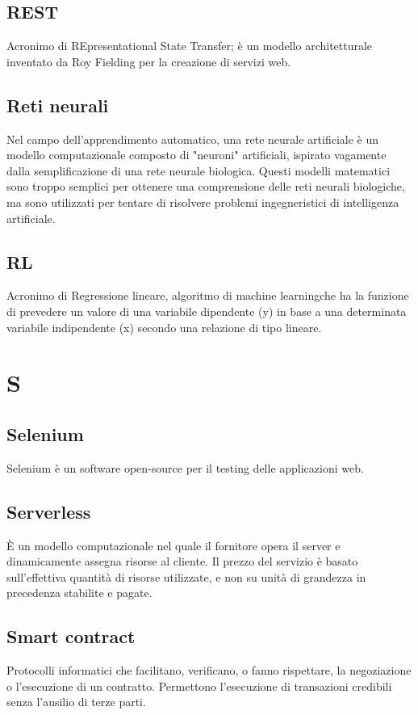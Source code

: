 \subsection*{REST}
Acronimo di REpresentational State Transfer; è un modello architetturale inventato da Roy Fielding per la creazione di servizi web.

\subsection*{Reti neurali}
Nel campo dell'apprendimento automatico, una rete neurale artificiale  è un modello computazionale composto di "neuroni" artificiali, ispirato vagamente dalla semplificazione di una rete neurale biologica. Questi modelli matematici sono troppo semplici per ottenere una comprensione delle reti neurali biologiche, ma sono utilizzati per tentare di risolvere problemi ingegneristici di intelligenza artificiale.

\subsection*{RL}
Acronimo di Regressione lineare, algoritmo di machine learning\glosp che ha la funzione di prevedere un valore di una variabile dipendente (y) in base a una determinata variabile indipendente (x) secondo una relazione di tipo lineare.

\clearpage
\section*{S}

\subsection{Selenium}
Selenium è un software open-source per il testing delle applicazioni web.

\subsection*{Serverless}
È un modello computazionale nel quale il fornitore opera il server e dinamicamente assegna risorse al cliente. Il prezzo del servizio è basato sull'effettiva quantità di risorse utilizzate, e non su unità di grandezza in precedenza stabilite e pagate.

\subsection*{Smart contract}
Protocolli informatici che facilitano, verificano, o fanno rispettare, la negoziazione o l'esecuzione di un contratto. Permettono l'esecuzione di transazioni credibili senza l'ausilio di terze parti.

